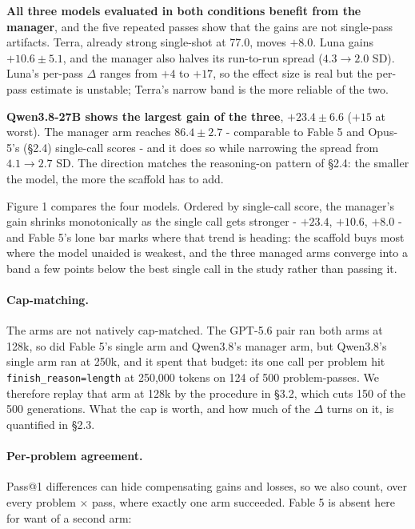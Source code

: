 \documentclass[11pt]{article}
\begin{document}
\textbf{All three models evaluated in both conditions benefit from the manager}, and the
five repeated passes show that the gains are not single-pass artifacts. Terra, already strong
single-shot at 77.0, moves $+8.0$.
Luna gains $+10.6 \pm 5.1$, and the manager also halves its run-to-run spread
($4.3 \to 2.0$ SD).
Luna's per-pass $\Delta$ ranges from $+4$ to $+17$, so the effect size is real but the
per-pass estimate is unstable; Terra's narrow band is the more reliable of the two.

\textbf{Qwen3.8-27B shows the largest gain of the three}, $+23.4 \pm 6.6$ ($+15$ at
worst). The manager arm reaches $86.4 \pm 2.7$ - comparable to Fable 5 and Opus-5's (\S2.4) single-call scores -
and it does so while narrowing the spread from $4.1 \to 2.7$ SD. The direction matches the
reasoning-on pattern of \S2.4: the smaller the model, the more the scaffold has to add.

Figure 1 compares the four models. Ordered by single-call score, the manager's gain
shrinks monotonically as the single call gets stronger - $+23.4$, $+10.6$, $+8.0$ - and
Fable 5's lone bar marks where that trend is heading: the scaffold buys most where the
model unaided is weakest, and the three managed arms converge into a band a few points
below the best single call in the study rather than passing it.



\paragraph{Cap-matching.}
The arms are not natively cap-matched. The GPT-5.6 pair ran both arms at 128k, so did
Fable 5's single arm and Qwen3.8's manager arm, but Qwen3.8's single arm ran at 250k, and
it spent that budget: its one call per problem hit \texttt{finish\_reason=length} at
250,000 tokens on 124 of 500 problem-passes. We therefore replay that arm at 128k by the
procedure in \S3.2, which cuts 150 of the 500 generations. What the cap is worth, and how
much of the $\Delta$ turns on it, is quantified in \S2.3.

\paragraph{Per-problem agreement.}
Pass@1 differences can hide compensating gains and losses, so we also count, over every
problem $\times$ pass, where exactly one arm succeeded. Fable 5 is absent here for want of
a second arm:
\end{document}

